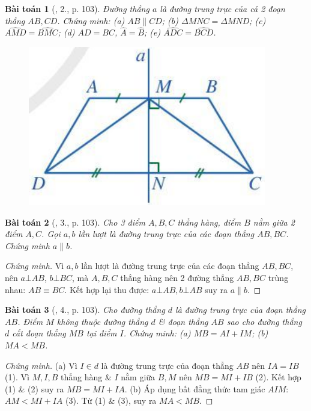 \documentclass{article}
\newtheorem{baitoan}{Bài toán}
\begin{document}
\begin{baitoan}[\cite{SGK_Toan_7_Canh_Dieu_tap_2}, 2., p. 103]
	Đường thẳng $a$ là đường trung trực của cả 2 đoạn thẳng $AB,CD$. Chứng minh: (a) $AB\parallel CD$; (b) $\Delta MNC = \Delta MND$; (c) $\widehat{AMD} = \widehat{BMC}$; (d) $AD = BC$, $\widehat{A} = \widehat{B}$; (e) $\widehat{ADC} = \widehat{BCD}$.
	\begin{figure}[H]
		\centering
		\includegraphics[scale=.3]{SGK_Toan_7_CD_95}
	\end{figure}
\end{baitoan}

\begin{baitoan}[\cite{SGK_Toan_7_Canh_Dieu_tap_2}, 3., p. 103]
	Cho 3 điểm $A,B,C$ thẳng hàng, điểm $B$ nằm giữa 2 điểm $A,C$. Gọi $a,b$ lần lượt là đường trung trực của các đoạn thẳng $AB,BC$. Chứng minh $a\parallel b$.
\end{baitoan}

\begin{proof}[Chứng minh]
	Vì $a,b$ lần lượt là đường trung trực của các đoạn thẳng $AB,BC$, nên $a\bot AB$, $b\bot BC$, mà $A,B,C$ thẳng hàng nên 2 đường thẳng $AB,BC$ trùng nhau: $AB\equiv BC$. Kết hợp lại thu được: $a\bot AB,b\bot AB$ suy ra $a\parallel b$.
\end{proof}

\begin{baitoan}[\cite{SGK_Toan_7_Canh_Dieu_tap_2}, 4., p. 103]
	Cho đường thẳng $d$ là đường trung trực của đoạn thẳng $AB$. Điểm $M$ không thuộc đường thẳng $d$ \& đoạn thẳng $AB$ sao cho đường thẳng $d$ cắt đoạn thẳng $MB$ tại điểm $I$. Chứng minh: (a) $MB = AI + IM$; (b) $MA < MB$.
\end{baitoan}

\begin{proof}[Chứng minh]
	(a) Vì $I\in d$ là đường trung trực của đoạn thẳng $AB$ nên $IA = IB$ (1). Vì $M,I,B$ thẳng hàng \& $I$ nằm giữa $B,M$ nên $MB = MI + IB$ (2). Kết hợp (1) \& (2) suy ra $MB = MI + IA$. (b) Áp dụng bất đẳng thức tam giác $AIM$: $AM < MI + IA$ (3). Từ (1) \& (3), suy ra $MA < MB$.
\end{proof}
\end{document}
